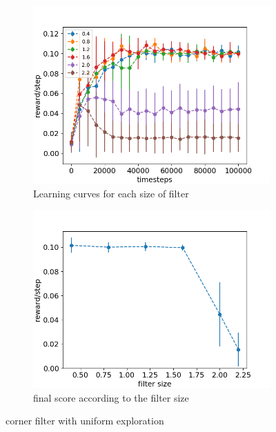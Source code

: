 \documentclass{article}
\begin{document}
\begin{figure}[H]
  \centering
   \begin{subfigure}[b]{0.4\linewidth}
    \includegraphics[width=\linewidth]{Study_2/2.3/visualizations/scores_filter_size.png}
      \caption{Learning curves for each size of filter}
  \end{subfigure}
  \begin{subfigure}[b]{0.4\linewidth}
    \includegraphics[width=\linewidth]{Study_2/2.3/visualizations/total_scores.png}
    \caption{final score according to the filter size}
  \end{subfigure}
   \caption{corner filter with uniform exploration}
    \label{fig:corner_curves_uniform}
\end{figure}
\end{document}
